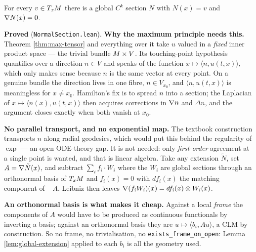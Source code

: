 \begin{lemma}
  \label{lem:normal-section}
  \leanok
  For every $v \in T_xM$ there is a global $C^k$ section $N$ with $N(x) = v$ and
  $\nabla N(x) = 0$.

  \textbf{Proved} (\texttt{NormalSection.lean}). \textbf{Why the maximum principle needs
  this.} Theorem \ref{thm:max-tensor} and everything over it take $u$ valued in a
  \emph{fixed} inner product space --- the trivial bundle $M \times V$. Its touching-point
  hypothesis quantifies over a direction $n \in V$ and speaks of the function
  $x \mapsto \langle n, u(t,x)\rangle$, which only makes sense because $n$ is the same vector
  at every point. On a genuine bundle the direction lives in one fibre, $n \in V_{x_0}$, and
  $\langle n, u(t,x)\rangle$ is meaningless for $x \ne x_0$. Hamilton's fix is to spread $n$
  into a section; the Laplacian of $x \mapsto \langle n(x), u(t,x)\rangle$ then acquires
  corrections in $\nabla n$ and $\Delta n$, and the argument closes exactly when both vanish at
  $x_0$.

  \textbf{No parallel transport, and no exponential map.} The textbook construction transports
  $n$ along radial geodesics, which would put this behind the regularity of $\exp$ --- an open
  ODE-theory gap. It is not needed: only \emph{first-order} agreement at a single point is
  wanted, and that is linear algebra. Take any extension $\tilde N$, set
  $A = \nabla\tilde N(x)$, and subtract $\sum_i f_i \cdot W_i$ where the $W_i$ are global
  sections through an orthonormal basis of $T_xM$ and $f_i(x) = 0$ with $df_i(x)$ the
  matching component of $-A$. Leibniz then leaves $\nabla(f_i W_i)(x) = df_i(x) \otimes W_i(x)$.

  \textbf{An orthonormal basis is what makes it cheap.} Against a local \emph{frame} the
  components of $A$ would have to be produced as continuous functionals by inverting a basis;
  against an orthonormal basis they are $u \mapsto \langle b_i, Au\rangle$, a CLM by
  construction. So no frame, no trivialisation, no \texttt{exists\_frame\_on\_open}: Lemma
  \ref{lem:global-extension} applied to each $b_i$ is all the geometry used.


\end{lemma}
